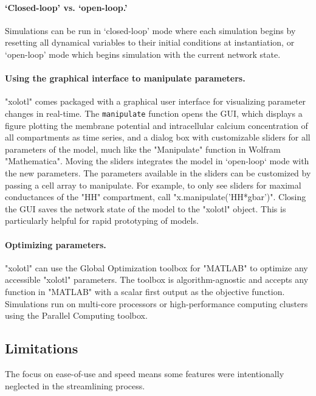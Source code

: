\documentclass{frontiersSCNS} %
\begin{document}
\paragraph{`Closed-loop' vs. `open-loop.'}
Simulations can be run in `closed-loop' mode where each simulation begins by resetting all dynamical variables to their initial conditions at instantiation, or `open-loop' mode which begins simulation with the current network state.

\paragraph{Using the graphical interface to manipulate parameters.}

"xolotl" comes packaged with a graphical user interface for visualizing parameter changes in real-time. The \texttt{manipulate} function opens the GUI, which displays a figure plotting the membrane potential and intracellular calcium concentration of all compartments as time series, and a dialog box with customizable sliders for all parameters of the model, much like the "Manipulate" function in Wolfram "Mathematica". Moving the sliders integrates the model in `open-loop` mode with the new parameters. The parameters available in the sliders can be customized by passing a cell array to manipulate. For example, to only see sliders for maximal conductances of the "HH" compartment, call "x.manipulate('HH*gbar')". Closing the GUI saves the network state of the model to the "xolotl" object. This is particularly helpful for rapid prototyping of models.

\paragraph{Optimizing parameters.}
"xolotl" can use the Global Optimization toolbox for "MATLAB" to optimize any accessible "xolotl" parameters. The toolbox is algorithm-agnostic and accepts any function in "MATLAB" with a scalar first output as the objective function. Simulations run on multi-core processors or high-performance computing clusters using the Parallel Computing toolbox.

\subsection{Limitations}
\label{limitations}

The focus on ease-of-use and speed means some features were intentionally neglected in the streamlining process. 
\end{document}
